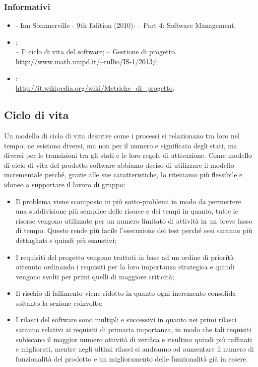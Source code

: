 \subsubsection{Informativi}
\label{2.4.2}
\begin{itemize}
\item {} - Ian Sommerville - 9th Edition (2010):
– Part 4: Software Management.
\item {}:\\
– Il ciclo di vita del software;
– Gestione di progetto.\\
\url{http://www.math.unipd.it/~tullio/IS-1/2013/};
\item {}:\\
\url{http://it.wikipedia.org/wiki/Metriche_di_progetto}.
\end{itemize}

\subsection{Ciclo di vita}
\label{2.5}
Un modello di ciclo di vita descrive come i processi si relazionano tra loro nel tempo; ne esistono diversi, ma non per il numero e significato degli stati, ma diversi per le transizioni tra gli stati e le loro regole di attivazione.
Come modello di ciclo di vita del prodotto software abbiamo deciso di utilizzare il modello incrementale perché, grazie alle sue caratteristiche, lo riteniamo più flessibile e idoneo a supportare il lavoro di gruppo:
\begin{itemize}
\item Il problema viene scomposto in più sotto-problemi in modo da permettere una suddivisione più semplice delle risorse e dei tempi in quanto, tutte le risorse vengono utilizzate per un numero limitato di attività in un breve lasso di tempo. Questo rende più facile l'esecuzione dei test perché essi saranno più dettagliati e quindi più esaustivi;
\item I requisiti del progetto vengono trattati in base ad un ordine di priorità ottenuto ordinando i requisiti per la loro importanza strategica e quindi vengono svolti per primi quelli di maggiore criticità;
\item Il rischio di fallimento viene ridotto in quanto ogni incremento consolida soltanto la sezione coinvolta;
\item I rilasci del software sono multipli e successivi in quanto nei primi rilasci saranno relativi ai requisiti di primaria importanza, in modo che tali requisiti subiscano il maggior numero attività di verifica e risultino quindi più raffinati e migliorati, mentre negli ultimi rilasci si andranno ad aumentare il numero di funzionalità del prodotto e un miglioramento delle funzionalità già in essere.
\end{itemize}

